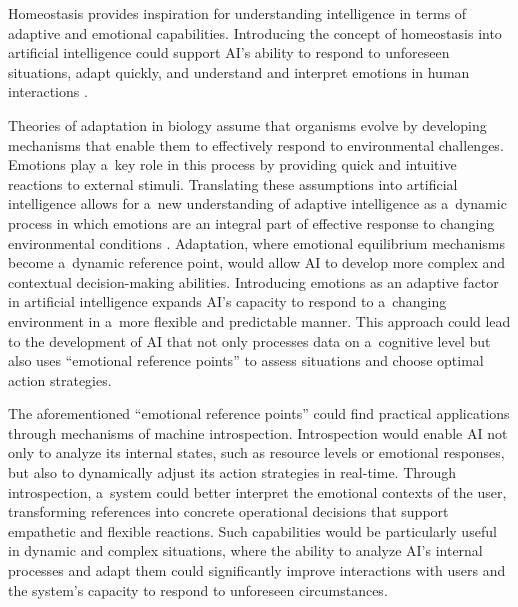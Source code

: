 \documentclass[%
  manuscript=article,
  year=2024,
  volume=77,
  doi=00000.000,
]{zfn}
\begin{document}
Homeostasis provides inspiration for understanding intelligence in terms of adaptive and emotional capabilities. Introducing the concept of homeostasis into artificial intelligence could support AI's ability to respond to unforeseen situations, adapt quickly, and understand and interpret emotions in human interactions 
\parencites[][]{gros_emotions_2021}[][]{zhou_emotional_2021}.%
~



Theories of adaptation in biology assume that organisms evolve by developing mechanisms that enable them to effectively respond to environmental challenges. Emotions play a~key role in this process by providing quick and intuitive reactions to external stimuli. Translating these assumptions into artificial intelligence allows for a~new understanding of adaptive intelligence as a~dynamic process in which emotions are an integral part of effective response to changing environmental conditions 
\parencites[][]{assuncao_emotional_2022}[][]{zhao_role_2022}. %
 Adaptation, where emotional equilibrium mechanisms become a~dynamic reference point, would allow AI to develop more complex and contextual decision-making abilities. Introducing emotions as an adaptive factor in artificial intelligence expands AI's capacity to respond to a~changing environment in a~more flexible and predictable manner. This approach could lead to the development of AI that not only processes data on a~cognitive level but also uses ``emotional reference points'' to assess situations and choose optimal action strategies.



The aforementioned ``emotional reference points'' could find practical applications through mechanisms of machine introspection. Introspection would enable AI not only to analyze its internal states, such as resource levels or emotional responses, but also to dynamically adjust its action strategies in real-time. Through introspection, a~system could better interpret the emotional contexts of the user, transforming references into concrete operational decisions that support empathetic and flexible reactions. Such capabilities would be particularly useful in dynamic and complex situations, where the ability to analyze AI's internal processes and adapt them could significantly improve interactions with users and the system's capacity to respond to unforeseen circumstances.
\end{document}
